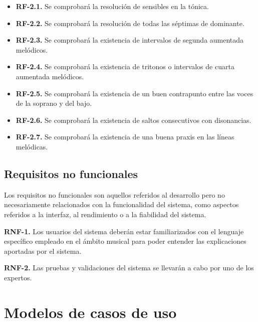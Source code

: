 \begin{itemize}

	\bigskip
	\item \textbf{RF-2.1.} Se comprobará la resolución de sensibles en la tónica.

	\bigskip
	\item \textbf{RF-2.2.} Se comprobará la resolución de todas las séptimas de dominante.

	\bigskip	
	\item \textbf{RF-2.3.} Se comprobará la existencia de intervalos de segunda aumentada melódicos.

	\bigskip
	\item \textbf{RF-2.4.} Se comprobará la existencia de tritonos o intervalos de cuarta aumentada melódicos.

	\bigskip
	\item \textbf{RF-2.5.} Se comprobará la existencia de un buen contrapunto entre las voces de la soprano y del bajo.

	\bigskip
	\item \textbf{RF-2.6.} Se comprobará la existencia de saltos consecutivos con disonancias.

	\bigskip
	\item \textbf{RF-2.7.} Se comprobará la existencia de una buena praxis en las líneas melódicas. 

\end{itemize}

\subsection{Requisitos no funcionales}

Los requisitos no funcionales son aquellos referidos al desarrollo pero no necesariamente relacionados con la funcionalidad del sistema, como aspectos referidos a la interfaz, al rendimiento o a la fiabilidad del sistema.

\bigskip
\textbf{RNF-1.} Los usuarios del sistema deberán estar familiarizados con el lenguaje específico empleado en el ámbito musical para poder entender las explicaciones aportadas por el sistema.

\textbf{RNF-2.} Las pruebas y validaciones del sistema se llevarán a cabo por uno de los expertos.

\section{Modelos de casos de uso}

